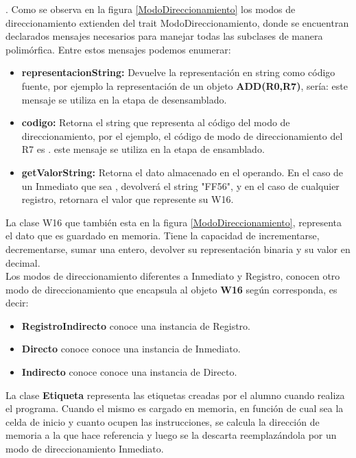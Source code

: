 . 
Como se observa en la figura \ref{ModoDireccionamiento} los modos de direccionamiento extienden del trait ModoDireccionamiento, donde se encuentran declarados mensajes necesarios para manejar todas las subclases de manera polimórfica. Entre estos mensajes podemos enumerar:
\begin{itemize}
\item  \textbf{representacionString:}
Devuelve la representación en string como código fuente, por ejemplo la representación de un objeto
 \textbf{ADD(R0,R7)}, sería:  este mensaje se utiliza en la etapa de desensamblado.
\item  \textbf{codigo:}
Retorna el string que representa al código del modo de direccionamiento, por el ejemplo, el código de modo de direccionamiento del R7 es . este mensaje se utiliza en la etapa de ensamblado.
\item  \textbf{getValorString:}
Retorna el dato almacenado en el operando. En el caso de un Inmediato que sea , devolverá el string "FF56", y en el caso de cualquier registro, retornara el valor que represente su W16.
\end{itemize}


La clase W16 que también esta en la figura \ref{ModoDireccionamiento}, representa el dato que es guardado en memoria. Tiene la capacidad de incrementarse, decrementarse, sumar una entero, devolver su representación binaria y su valor en decimal.\\

Los modos de direccionamiento diferentes a Inmediato y Registro, conocen otro modo de direccionamiento que encapsula al objeto \textbf{W16} según corresponda, es decir:
\begin{itemize}
\item \textbf{RegistroIndirecto} conoce una instancia de Registro.
\item \textbf{Directo} conoce conoce una instancia de Inmediato.
\item \textbf{Indirecto} conoce conoce una instancia de Directo.
\end{itemize}

La clase \textbf{Etiqueta} representa las etiquetas creadas por el alumno cuando realiza el programa. Cuando el mismo es cargado en memoria, en función de cual sea la celda de inicio y cuanto ocupen las instrucciones, se calcula la dirección de memoria a la que hace referencia y luego se la descarta reemplazándola por un modo de direccionamiento Inmediato.

